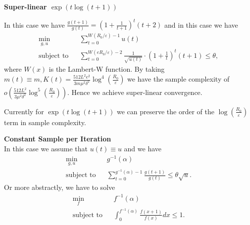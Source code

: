 \documentclass{article}
\newcommand{\cdummy}{\cdot}
\newcommand{\tmstrong}[1]{\textbf{#1}}
\begin{document}
{\tmstrong{Super-linear $\exp (t \log (t + 1))$}}

In this case we have $\frac{g (t + 1)}{g (t)} = \left( 1 + \frac{1}{t + 1}
\right)^t (t + 2)$ and in this case we have
\begin{eqnarray*}
  \min_{g, u} & &\sum_{t = 0}^{W (R_0 / \varepsilon) - 1} u (t) \\
  \text{subject to} & &\sum_{t = 0}^{W (e R_0 / \varepsilon) - 2}
  \frac{1}{\sqrt{u (t)}} \cdummy \left( 1 + \frac{1}{t} \right)^t (t + 1) \leq
  \theta ,
\end{eqnarray*}
where $W (x)$ is the Lambert-W function. By taking $m (t) \equiv m, K (t) =
\frac{512 L^2 e^2}{3 m \mu^2 \delta^2} \log^4 \left( \frac{R_0}{\varepsilon}
\right)$ we have the sample complexity of $o \left( \frac{512 L^2}{3 \mu^2
\delta^2} \log^5 \left( \frac{R_0}{\varepsilon} \right) \right)$. Hence we
achieve super-linear convergence.\\

\begin{remark}
	Currently for $\exp (t \log (t + 1))$ we can preserve the order of the $\log\left( \frac{R_0}{\varepsilon} \right)$ term in sample complexity.\\
\end{remark}

   
{\tmstrong{Constant Sample per Iteration}}\\
In this case we assume that $u (t) \equiv u$ and we have
\begin{eqnarray*}
  \min_{g, u} & & g^{- 1} (\alpha)\\
  \text{subject to}& & \sum_{t = 0}^{g^{- 1} (\alpha) - 1} \frac{g (t + 1)}{g
  (t)} \leq \theta \sqrt{u}.
\end{eqnarray*}
Or more abstractly, we have to solve
\begin{eqnarray*}
  \min_f & &f^{- 1} (\alpha) \\
  \text{subject to} & & \int_0^{f^{- 1} (\alpha)} \frac{f (x + 1)}{f (x)} d x
  \leq 1.
\end{eqnarray*}




\end{document}
